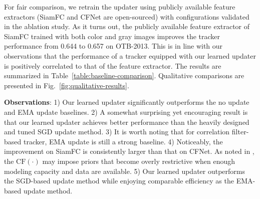 \documentclass[journal]{IEEEtran}
\begin{document}
For fair comparison, we retrain the updater using publicly available feature extractors (SiamFC and CFNet are open-sourced) with configurations validated in the ablation study. As it turns out, the publicly available feature extractor of SiamFC trained with both color and gray images improves the tracker performance from 0.644 to 0.657 on OTB-2013. This is in line with our observations that the performance of a tracker equipped with our learned updater is positively correlated to that of the feature extractor.
 The results are summarized in Table~\ref{table:baseline-comparison}. Qualitative comparisons are presented in Fig.~\ref{fig:qualitative-results}.

\textbf{Observations}:
1) Our learned updater significantly outperforms the no update and EMA update baselines. 
2) A somewhat surprising yet encouraging result is that our learned updater achieves better performance than the heavily designed and tuned SGD update method. 
3) It is worth noting that for correlation filter-based tracker, EMA update is still a strong baseline.
4) Noticeably, the improvement on SiamFC is consistently larger than that on CFNet. As noted in \cite{valmadre2017end}, the $\mathrm{CF}(\cdot)$ may impose priors that become overly restrictive when enough modeling capacity and data are available.
5) Our learned updater outperforms the SGD-based update method while enjoying comparable efficiency as the EMA-based update method.
\end{document}
